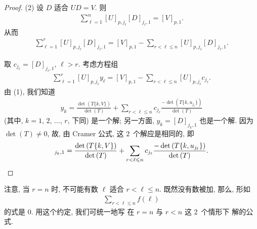 \documentclass[../libro.tex]{subfiles}
\begin{document}
\begin{proof}
    (2)
    设 \(D\) 适合 \(UD = V\).
    则
    \begin{align*}
        \sum_{\ell = 1}^{n}
        {[U]_{p,j_\ell} [D]_{j_\ell,1}}
        = [V]_{p,1}.
    \end{align*}
    从而
    \begin{align*}
        \sum_{\ell = 1}^{r}
        {[U]_{p,j_\ell} [D]_{j_\ell,1}}
        = [V]_{p,1}
        - \sum_{r < \ell \leq n}
        {[U]_{p,j_\ell} [D]_{j_\ell,1}}.
    \end{align*}

    取 \(c_{j_\ell} = [D]_{j_\ell,1}\),
    \(\ell > r\).
    考虑方程组
    \begin{align*}
        \sum_{\ell = 1}^{r}
        {[U]_{p,j_\ell} y_\ell}
        = [V]_{p,1}
        - \sum_{r < \ell \leq n}
        {[U]_{p,j_\ell} c_{j_\ell}}.
    \end{align*}
    由 (1), 我们知道
    \begin{align*}
        y_k =
        \frac{\det {(T\{k,V\})}}{\det {(T)}}
        + \sum_{r < \ell \leq n}
        {c_{j_\ell}
        \frac{-\det {(T\{k,u_{j_\ell}\})}}{\det {(T)}}}
    \end{align*}
    (其中, \(k = 1\), \(2\), \(\dots\), \(r\), 下同)
    是一个解;
    另一方面,
    \(y_k = [D]_{j_k,1}\) 也是一个解.
    因为 \(\det {(T)} \neq 0\),
    故, 由 Cramer 公式,
    这 \(2\)~个解应是相同的,
    即
    \begin{equation*}
        [D]_{j_k,1} =
        \frac{\det {(T\{k,V\})}}{\det {(T)}}
        + \sum_{r < \ell \leq n}
        {c_{j_\ell}
        \frac{-\det {(T\{k,u_{j_\ell}\})}}{\det {(T)}}}.
        \qedhere
    \end{equation*}
\end{proof}

注意, 当 \(r = n\) 时,
不可能有数 \(\ell\) 适合 \(r < \ell \leq n\).
既然没有数被加, 那么, 形如
\begin{align*}
    \sum_{r < \ell \leq n} {f(\ell)}
\end{align*}
的式是 \(0\).
用这个约定,
我们可统一地写%
在 \(r = n\) 与 \(r < n\) 这 \(2\)~个情形下%
解的公式.
\end{document}
